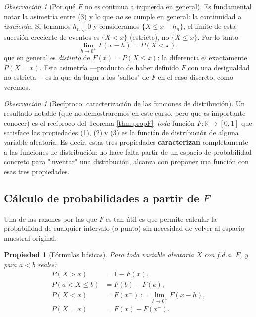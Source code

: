 \documentclass[11pt,a4paper]{article}
\theoremstyle{plain}
\newtheorem{propiedad}[teorema]{Propiedad}
\theoremstyle{definition}
\theoremstyle{remark}
\newtheorem{observacion}[teorema]{Observación}
\begin{document}
\begin{observacion}[Por qué $F$ no es continua a izquierda en general]
Es fundamental notar la asimetría entre (3) y lo que \emph{no} se cumple en general: la continuidad a \emph{izquierda}. Si tomamos $h_n\downarrow 0$ y consideramos $\{X\le x-h_n\}$, el límite de esta sucesión creciente de eventos es $\{X<x\}$ (estricto), no $\{X\le x\}$. Por lo tanto
$$\lim_{h\to 0^+}F(x-h)=P(X<x),$$
que en general es \emph{distinto} de $F(x)=P(X\le x)$: la diferencia es exactamente $P(X=x)$. Esta asimetría —producto de haber definido $F$ con una desigualdad no estricta— es la que da lugar a los "saltos" de $F$ en el caso discreto, como veremos.
\end{observacion}

\begin{observacion}[Recíproco: caracterización de las funciones de distribución]
Un resultado notable (que no demostraremos en este curso, pero que es importante conocer) es el recíproco del Teorema \ref{thm:propF}: \emph{toda} función $F:\mathbb{R}\to[0,1]$ que satisface las propiedades (1), (2) y (3) es la función de distribución de alguna variable aleatoria. Es decir, estas tres propiedades \textbf{caracterizan} completamente a las funciones de distribución: no hace falta partir de un espacio de probabilidad concreto para "inventar" una distribución, alcanza con proponer una función con esas tres propiedades.
\end{observacion}

\subsection{Cálculo de probabilidades a partir de \texorpdfstring{$F$}{F}}

Una de las razones por las que $F$ es tan útil es que permite calcular la probabilidad de cualquier intervalo (o punto) sin necesidad de volver al espacio muestral original.

\begin{propiedad}[Fórmulas básicas]\label{prop:formulas}
Para toda variable aleatoria $X$ con f.d.a. $F$, y para $a<b$ reales:
\begin{align}
P(X>x)&=1-F(x), \label{eq:complemento}\\
P(a<X\le b)&=F(b)-F(a), \label{eq:intervalo}\\
P(X<x)&=F(x^-):=\lim_{h\to 0^+}F(x-h), \label{eq:menorestricto}\\
P(X=x)&=F(x)-F(x^-). \label{eq:puntual}
\end{align}
\end{propiedad}
\end{document}

